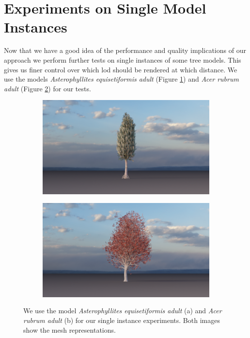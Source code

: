\section{Experiments on Single Model Instances}
\label{sec:experiments_on_single_model_instances}
Now that we have a good idea of the performance and quality implications of our approach we perform further tests on single instances of some tree models.
This gives us finer control over which \ac{lod} should be rendered at which distance.
We use the models \textit{Asterophyllites equisetiformis adult} (Figure \ref{fig:PR04a}) and \textit{Acer rubrum adult} (Figure \ref{fig:EA01a}) for our tests.
\begin{figure}[ht]
    \centering
    \begin{subfigure}[b]{0.49\linewidth}
        \centering
        \includegraphics[width=1\linewidth]{img/results/PR04a.png}
        \caption{}
        \label{fig:PR04a}
    \end{subfigure}
    \begin{subfigure}[b]{0.49\linewidth}
        \centering
        \includegraphics[width=1\linewidth]{img/results/EA01a.png}
        \caption{}
        \label{fig:EA01a}
    \end{subfigure}
	\caption[Models for single instance experiments]{We use the model \textit{Asterophyllites equisetiformis adult} (a) and \textit{Acer rubrum adult} (b) for our single instance experiments. Both images show the mesh representations.}
	\label{fig:single_model_instances}
\end{figure}

